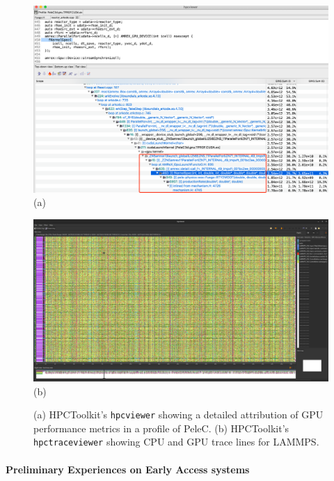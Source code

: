 \begin{figure}[t]
\captionsetup{width=.96\textwidth}
\begin{minipage}[t]{.40\textwidth}
\centering
\includegraphics[width=\textwidth]{projects/2.3.2-Tools/2.3.2.08-HPCToolkit/hpctoolkit-pelec-profiles}
\\(a)
\end{minipage}
\hfill
\begin{minipage}[t]{.46\textwidth}
\centering
\includegraphics[width=\textwidth]{projects/2.3.2-Tools/2.3.2.08-HPCToolkit/hpctoolkit-lammps-traces}
\\(b)
\end{minipage}
\caption{(a) 
HPCToolkit's \texttt{hpcviewer} showing a detailed attribution of GPU performance metrics in a 
profile of PeleC.
(b) HPCToolkit's \texttt{hpctraceviewer} showing CPU and GPU trace lines for LAMMPS.}
\label{fig:hpctoolkit}
\end{figure}

\paragraph{Preliminary Experiences on Early Access systems}

